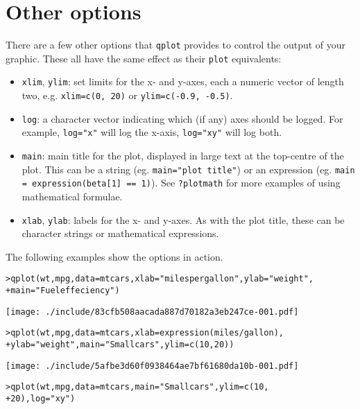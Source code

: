 \section{Other options}\label{sec:other_options}

There are a few other options that {\tt qplot} provides to control the output of your graphic.  These all have the same effect as their {\tt plot} equivalents:

\begin{itemize}
	\item {\tt xlim}, {\tt ylim}: set limits for the x- and y-axes, each a numeric vector of length two, e.g. {\tt xlim=c(0, 20)} or {\tt ylim=c(-0.9, -0.5)}.
	\item {\tt log}: a character vector indicating which (if any) axes should be logged.  For example, {\tt log="x"} will log the x-axis, {\tt log="xy"} will log both.
	\item {\tt main}: main title for the plot, displayed in large text at the top-centre of the plot.  This can be a string (eg. {\tt main="plot title"}) or an expression (eg. {\tt main = expression(beta[1] == 1)}).  See {\tt ?plotmath} for more examples of using mathematical formulae.
	\item {\tt xlab}, {\tt ylab}: labels for the x- and y-axes.  As with the plot title, these can be character strings or mathematical expressions.
\end{itemize}

The following examples show the options in action.

\begin{alltt}
> qplot(wt, mpg, data = mtcars, xlab = "miles per gallon", ylab = "weight", 
+     main = "Fuel effeciency")
\end{alltt}
\texttt{[image: ./include/83cfb508aacada887d70182a3eb247ce-001.pdf]}
\begin{alltt}

> qplot(wt, mpg, data = mtcars, xlab = expression(miles/gallon), 
+     ylab = "weight", main = "Small cars", ylim = c(10, 20))
\end{alltt}
\texttt{[image: ./include/5afbe3d60f0938464ae7bf61680da10b-001.pdf]}
\begin{alltt}

> qplot(wt, mpg, data = mtcars, main = "Small cars", ylim = c(10, 
+     20), log = "xy")
\end{alltt}
\begin{alltt}

\end{alltt}

